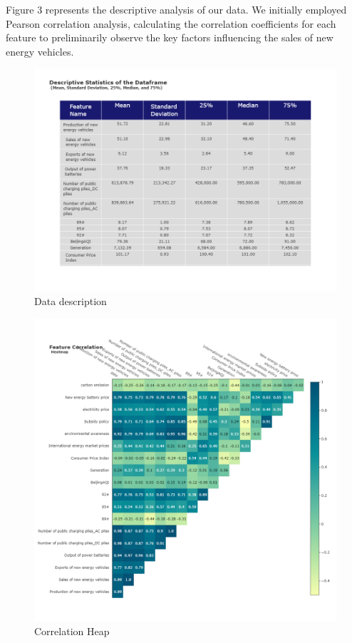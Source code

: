 \documentclass{apmcmthesis}
\begin{document}
Figure 3 represents the descriptive analysis of our data.
We initially employed Pearson correlation analysis, calculating the correlation coefficients for each feature to preliminarily observe the key factors influencing the sales of new energy vehicles. 
\begin{figure}[htbp]
    \centering
    \includegraphics[scale=0.3]{figures/Figure/问题一/数据预处理/description.png}
    \caption{Data description}
\end{figure}

\begin{figure}[htbp]
    \centering
    \includegraphics[scale=0.35]{figures/Figure/问题一/数据预处理/Correlation Heap.png}
    \caption{Correlation Heap}
\end{figure}
\end{document}

